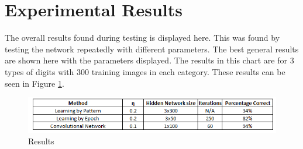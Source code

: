 \documentclass[12pt,twoside]{article} %
\begin{document}
\section{Experimental Results}
  The overall results found during testing is displayed here. This was found by testing the network repeatedly with different parameters. The best general results are shown here with the parameters displayed. The results in this chart are for 3 types of digits with 300 training images in each category. These results can be seen in Figure \ref{fig:results}.
  \begin{figure}
  	\hspace*{-.1cm}\includegraphics[scale=0.9]{overall_results}
  	\caption{Results}
  	\label{fig:results}
  \end{figure}
\\\\
	
\end{document}
